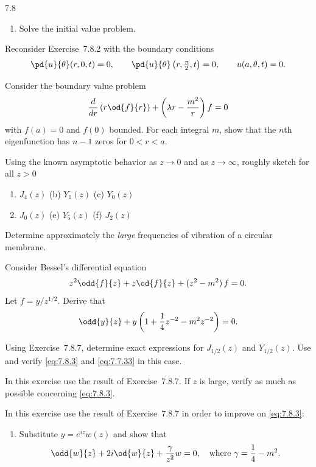 \begin{exercises}{7.8}
\begin{enumerate}
\item[\starred(d)] Solve the initial value problem.
\end{enumerate}

\item Reconsider Exercise~7.8.2 with the boundary conditions
\[
\pd{u}{\theta}(r,0,t) = 0, \qquad \pd{u}{\theta}\left(r,\tfrac{\pi}{2},t\right) = 0, \qquad u(a,\theta,t) = 0.
\]

\item Consider the boundary value problem
\[
\frac{d}{d r}\left(r\od{f}{r}\right) + \left(\lambda r - \frac{m^2}{r}\right)f = 0
\]
with $f(a) = 0$ and $f(0)$ bounded.  For each integral $m$, show that the $n$th eigenfunction has $n - 1$ zeros for $0 < r < a$.

\item Using the known asymptotic behavior as $z \to 0$ and as $z \to \infty$, roughly sketch for all $z > 0$

\begin{enumerate}
\item[(a)] $J_4(z)$ \qquad (b) $Y_1(z)$ \qquad (c) $Y_0(z)$
\item[(d)] $J_0(z)$ \qquad (e) $Y_5(z)$ \qquad (f) $J_2(z)$
\end{enumerate}

\item Determine approximately the \emph{large} frequencies of vibration of a circular membrane.

\item Consider Bessel's differential equation
\[
z^2\odd{f}{z} + z\od{f}{z} + (z^2 - m^2)\,f = 0.
\]
Let $f = y/z^{1/2}$.  Derive that
\[
\odd{y}{z} + y\left(1 + \frac{1}{4}z^{-2} - m^2 z^{-2}\right) = 0.
\]

\item[\starred] Using Exercise~7.8.7, determine exact expressions for $J_{1/2}(z)$ and $Y_{1/2}(z)$.  Use and verify \eqref{eq:7.8.3} and \eqref{eq:7.7.33} in this case.

\item In this exercise use the result of Exercise~7.8.7.  If $z$ is large, verify as much as possible concerning \eqref{eq:7.8.3}.

\item In this exercise use the result of Exercise~7.8.7 in order to improve on \eqref{eq:7.8.3}:
\begin{enumerate}
\item[(a)] Substitute $y = e^{iz}w(z)$ and show that
\[
\odd{w}{z} + 2i\od{w}{z} + \frac{\gamma}{z^2}w = 0, \quad\text{where } \gamma = \frac{1}{4} - m^2.
\]


\end{enumerate}
\end{exercises}
